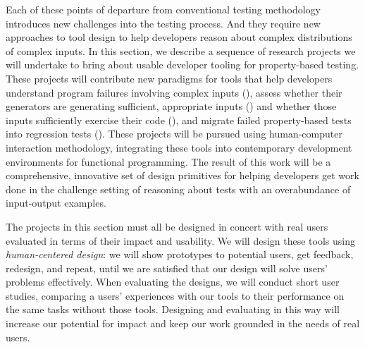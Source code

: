 Each of these points of departure from conventional testing methodology
introduces new challenges into the testing process. And they require new
approaches to tool design to help developers reason about complex distributions
of complex inputs. In this section, we describe a sequence of research projects
we will undertake to bring about usable developer tooling for property-based
testing. These projects will contribute new paradigms for tools that help
developers understand program failures involving complex inputs
(), assess whether their generators are generating
sufficient, appropriate inputs () and
whether those inputs sufficiently exercise their code
(), and migrate failed property-based tests into regression
tests ().
These projects will be pursued
using human-computer interaction methodology, integrating these tools into
contemporary development environments for functional programming. The result of
this work will be a comprehensive, innovative set of design primitives for
helping developers get work done in the challenge setting of reasoning about
tests with an overabundance of input-output examples.

The projects in this section must all be designed in concert with real users
evaluated in terms of their impact and usability. We will design these tools
using {\em human-centered design}: we will show prototypes to potential users,
get feedback, redesign, and repeat, until we are satisfied that our design will
solve users' problems effectively. When evaluating the designs, we will conduct
short user studies, comparing a users' experiences with our tools to their
performance on the same tasks without those tools. Designing and evaluating in
this way will increase our potential for impact and keep our work grounded in
the needs of real users.


